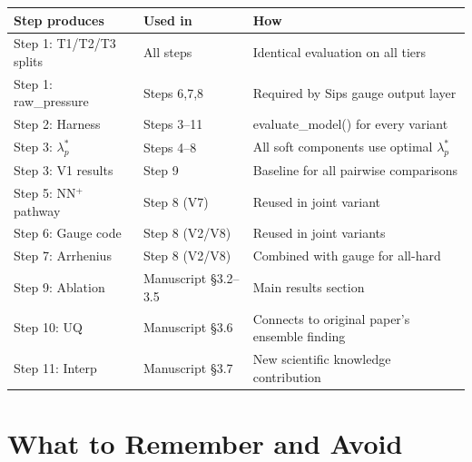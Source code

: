 \documentclass[12pt,a4paper]{article}
\begin{document}
\begin{center}
\small
\begin{tabular}{p{3cm}p{4cm}p{4.5cm}}
\toprule
\textbf{Step produces} & \textbf{Used in} & \textbf{How} \\
\midrule
Step 1: T1/T2/T3 splits & All steps & Identical evaluation on all tiers \\
Step 1: raw\_pressure & Steps 6,7,8 & Required by Sips gauge output layer \\
Step 2: Harness & Steps 3--11 & evaluate\_model() for every variant \\
Step 3: $\lambda_p^*$ & Steps 4--8 & All soft components use optimal $\lambda_p^*$ \\
Step 3: V1 results & Step 9 & Baseline for all pairwise comparisons \\
Step 5: NN$^+$ pathway & Step 8 (V7) & Reused in joint variant \\
Step 6: Gauge code & Step 8 (V2/V8) & Reused in joint variants \\
Step 7: Arrhenius & Step 8 (V2/V8) & Combined with gauge for all-hard \\
Step 9: Ablation & Manuscript \S3.2--3.5 & Main results section \\
Step 10: UQ & Manuscript \S3.6 & Connects to original paper's ensemble finding \\
Step 11: Interp & Manuscript \S3.7 & New scientific knowledge contribution \\
\bottomrule
\end{tabular}
\end{center}

\section{What to Remember and Avoid}
\end{document}
